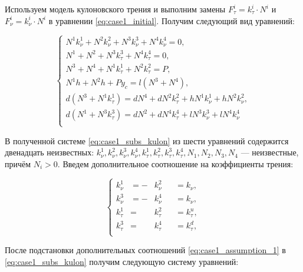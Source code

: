 Используем модель кулоновского трения и выполним замены $F_\tau^i = k_\tau^i\cdot N^i$ и $F_\nu^i = k_\nu^i\cdot N^i$ в уравнении \ref{eq:case1_initial}. Получим следующий вид уравнений:

\begin{equation}
\label{eq:case1_subs_kulon}
\left\{
  \begin{alignedat}{3}  
    N^1k_\nu^1 + N^2k_\nu^2 + N^3k_\nu^3 + N^4k_\nu^4 = 0,\\
    N^1 + N^2 + N^3k_\tau^3 + N^4k_\tau^4 = 0, \\
    N^3 + N^4 + N^1k_\tau^1 + N^2k_\tau^2 = P, \\
    N^1h + N^2h + Py_c = l(N^3 + N^4), \\
    d(N^3 + N^1k_\tau^1) = dN^4 + dN^2k_\tau^2 + hN^1k_\nu^1 + hN^2k_\nu^2,\\
    d(N^1 + N^3k_\tau^3) = dN^2 + dN^4k_\tau^4 + lN^3k_\nu^3 + lN^4k_\nu^4\\
  \end{alignedat}
\right.
\end{equation}


В полученной системе \ref{eq:case1_subs_kulon} из шести уравнений содержится двенадцать неизвестных:
$k_\nu^1, k_\nu^2, k_\nu^3, k_\nu^4, k_\tau^1, k_\tau^2, k_\tau^3, k_\tau^4, N_1, N_2, N_3, N_4$ --- неизвестные, причём $N_i>0$. Введем дополнительное соотношение на коэффициенты трения:

\begin{equation}
  \label{eq:case1_assumption_1}
  \left\{
    \begin{alignedat}{3}
      k_\nu^1  &= -&k_\nu^2& &= k_\nu,\\
      k_\nu^3  &= -&k_\nu^4& &= k_\nu,\\
      k_\tau^1 &= &k_\tau^2& &= k_\tau^u,\\
      k_\tau^3 &= &k_\tau^4& &= k_\tau^d,\\
    \end{alignedat}
  \right.
\end{equation}

После подстановки дополнительных соотношений \ref{eq:case1_assumption_1} в \ref{eq:case1_subs_kulon} получим следующую систему уравнений:

